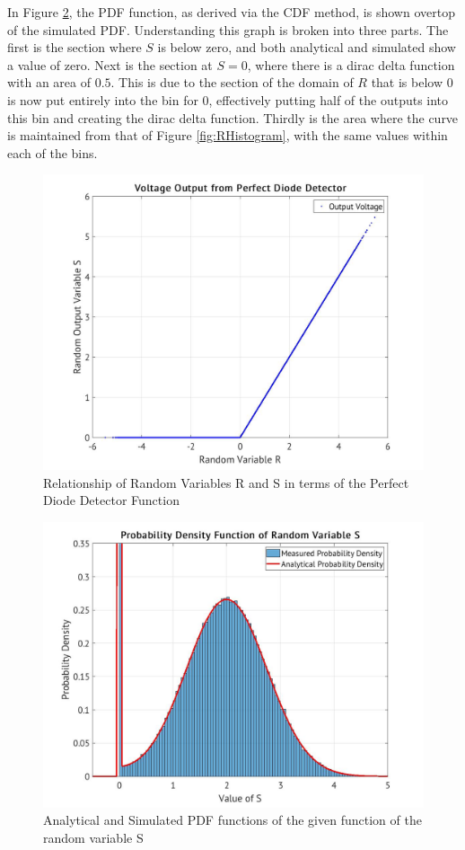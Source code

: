 \documentclass[a4paper, 11pt]{article}
\begin{document}
\bigskip
\noindent
In Figure \ref{fig:S1Histogram}, the PDF function, as derived via the CDF method, is shown overtop of the simulated PDF. Understanding this graph is broken into three parts.
The first is the section where \(S\) is below zero, and both analytical and simulated show a value of zero. Next is the section at \(S = 0\), where there is a dirac delta function with an area of \(0.5\).
This is due to the section of the domain of \(R\) that is below \(0\) is now put entirely into the bin for \(0\), effectively putting half of the outputs into this bin and creating the dirac delta function.
Thirdly is the area where the curve is maintained from that of Figure \ref{fig:RHistogram}, with the same values within each of the bins.

\begin{figure}[htbp]
\centering
\includegraphics[width=.9\linewidth]{./Images/PerfDiode3.jpg}
\caption{\label{fig:PerfDiodeScat}Relationship of Random Variables R and S in terms of the Perfect Diode Detector Function}
\end{figure}

\begin{figure}[htbp]
\centering
\includegraphics[width=.9\linewidth]{./Images/S1PDF4.jpg}
\caption{\label{fig:S1Histogram}Analytical and Simulated PDF functions of the given function of the random variable S}
\end{figure}
\end{document}
